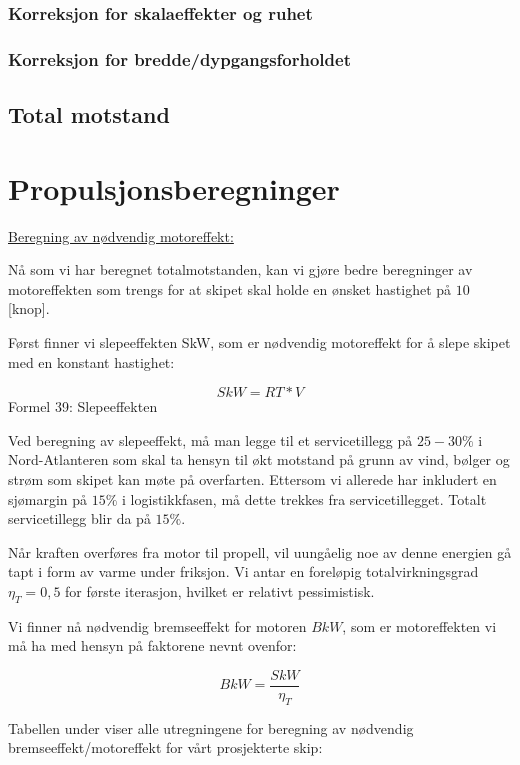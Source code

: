 \documentclass[norsk]{article}
\begin{document}
		\subsubsection{Korreksjon for skalaeffekter og ruhet}
		\subsubsection{ Korreksjon for bredde/dypgangsforholdet}
	\subsection{Total motstand}
	
	
\section{Propulsjonsberegninger}

\underline {Beregning av nødvendig motoreffekt:}

Nå som vi har beregnet totalmotstanden, kan vi gjøre bedre beregninger av motoreffekten som trengs for at skipet skal holde en ønsket hastighet på $10 $ [knop]. 

Først finner vi slepeeffekten SkW, som er nødvendig motoreffekt for å slepe skipet med en konstant hastighet:

\begin{equation}
SkW = RT * V
\end{equation}
Formel 39: Slepeeffekten

Ved beregning av slepeeffekt, må man legge til et servicetillegg på $25-30\%$ i Nord-Atlanteren som skal ta hensyn til økt motstand på grunn av vind, bølger og strøm som skipet kan møte på overfarten. Ettersom vi allerede har inkludert en sjømargin på $15\%$ i logistikkfasen, må dette trekkes fra servicetillegget. Totalt servicetillegg blir da på $15\%$. 

Når kraften overføres fra motor til propell, vil uungåelig noe av denne energien gå tapt i form av varme under friksjon. Vi antar en foreløpig totalvirkningsgrad ${\eta}_T = 0,5$ for første iterasjon, hvilket er relativt pessimistisk. 

Vi finner nå nødvendig bremseeffekt for motoren $BkW$, som er motoreffekten vi må ha med hensyn på faktorene nevnt ovenfor: 

\begin{equation}
BkW=\frac{SkW}{{\eta}_T}
\end{equation}


Tabellen under viser alle utregningene for beregning av nødvendig bremseeffekt/motoreffekt for vårt prosjekterte skip:
\end{document}
